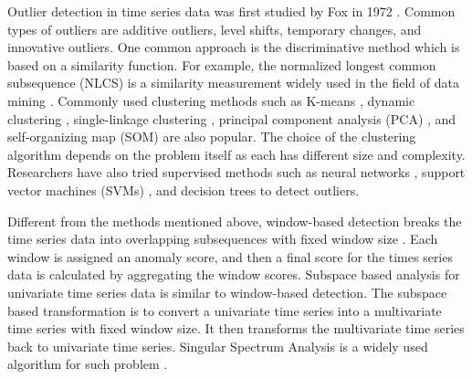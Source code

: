 Outlier detection in time series data was first studied by Fox in 1972
\cite{fox1972outliers}. Common types of outliers are additive outliers,
level shifts, temporary changes, and innovative outliers. One common
approach is the discriminative method which is based on a similarity
function. For example, the normalized longest common subsequence
(NLCS) is a similarity measurement widely used in the field of data
mining \cite{budalakoti2009anomaly, chandola2008comparative,
sequeira2002admit}. Commonly used clustering methods such as
K-means \cite{macqueen1967some}, dynamic clustering
\cite{sequeira2002admit}, single-linkage clustering
\cite{portnoy2001intrusion}, principal component analysis (PCA)
\cite{gupta2013context}, and self-organizing map (SOM)
\cite{gonzalez2003anomaly} are also popular. The choice of the
clustering algorithm depends on the problem itself as each has
different size and complexity. 
Researchers have also tried supervised
methods such as neural networks \cite{dasgupta2000comparison},
support vector machines (SVMs) \cite{li2006motion}, and decision
trees \cite{kang2005learning} to detect outliers.

Different from the methods mentioned above, window-based detection 
breaks the time series data into overlapping subsequences with fixed
window size \cite{cheboli2010anomaly}. Each window is assigned an
anomaly score, and then a final score for the times series data is
calculated by aggregating the window scores. Subspace based analysis for
univariate time series data is similar to window-based detection. The
subspace based transformation is to convert a univariate time series
into a multivariate time series with fixed window size. It then
transforms the multivariate time series back to univariate time series.
Singular Spectrum Analysis is a widely used algorithm for such problem
\cite{golyandina2013singular}.

